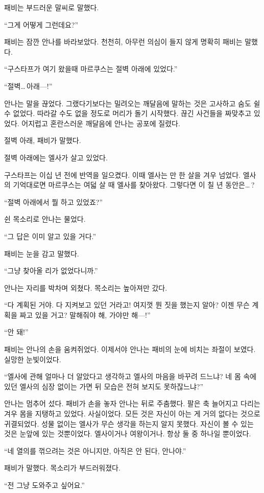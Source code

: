 패비는 부드러운 말씨로 말했다.

``그게 어떻게 그런데요?''

패비는 잠깐 안나를 바라보았다. 천천히, 아무런 의심이 들지 않게 명확히 패비는 말했다.

``구스타프가 여기 왔을때 마르쿠스는 절벽 아래에 있었다.''

``절벽\ldots\,아래—!''

안나는 말을 끊었다. 그랬다기보다는 밀려오는 깨달음에 말하는 것은 고사하고 숨도 쉴 수 없었다. 따라갈 수도 없을 정도로 머리가 돌기 시작했다. 끊긴 사건들을 짜맞추고 있었다. 어지럽고 혼란스러운 깨달음에 안나는 공포에 질렸다.

절벽 아래, 패비가 말했다.

절벽 아래에는 엘사가 살고 있었다.

구스타프는 이십 년 전에 반역을 일으켰다. 이때 엘사는 만 한 살을 겨우 넘었다. 엘사의 기억대로면 마르쿠스는 여덟 살 때 엘사를 찾아왔다. 그렇다면 이 칠 년 동안은\ldots\,?

``절벽 아래에서 뭘 하고 있었죠?''

쉰 목소리로 안나는 물었다.

``그 답은 이미 알고 있을 거다.''

패비는 눈을 감고 말했다.

``그냥 찾아올 리가 없었다니까.''

안나는 자리를 박차며 외쳤다. 목소리는 높아져만 갔다.

``다 계획된 거야. 다 지켜보고 있던 거라고! 여지껏 뭔 짓을 했는지 알아? 이젠 무슨 계획을 짜고 있을 거고? 말해줘야 해, 가야만 해—!''

``안 돼!''

패비는 안나의 손을 움켜쥐었다. 이제서야 안나는 패비의 눈에 비치는 좌절이 보였다. 실망한 눈빛이었다.

``엘사에 관해 얼마나 더 알았다고 생각하고 엘사의 마음을 바꾸려 드느냐? 네 몸 속에 있던 엘사의 심장 없이는 가면 뒤 모습은 전혀 보지도 못하잖느냐?''

안나는 멈추어 섰다. 패비가 손을 놓자 안나는 뒤로 주춤했다. 팔은 축 늘어지고 다리는 겨우 몸을 지탱하고 있었다. 사실이었다. 모든 것은 자신이 아는 게 거의 없다는 것으로 귀결되었다. 성물 없이는 엘사가 무슨 생각을 하는지 알지 못했다. 자신이 볼 수 있는 것은 눈앞에 있는 것뿐이었다. 엘사이거나 여왕이거나. 항상 둘 중 하나일 뿐이었다.

``네 열의를 꺾으려는 것은 아니지만, 아직은 안 된다, 안나야.''

패비가 말했다. 목소리가 부드러워졌다.

``전 그냥 도와주고 싶어요.''

